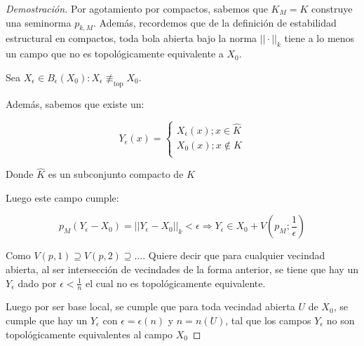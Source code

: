 \begin{proof}[Demostración]
	Por agotamiento por compactos, sabemos que $K_M = K$ construye una seminorma $p_{k,M}$. Además, recordemos que de la definición de estabilidad estructural en compactos, toda bola abierta bajo la norma $||\cdot||_{k}$ tiene a lo menos un campo que no es topológicamente equivalente a $X_0$. 
	
	Sea $X_\epsilon \in B_\epsilon(X_0): X_\epsilon \not \equiv_{\text{top}} X_0$. 
	
	Además, sabemos que existe un:
	
	\begin{equation*}
		Y_\epsilon(x) = \begin{cases}
			X_\epsilon(x) ; x \in \hat{K}\\
			X_0(x) ; x \notin K\\ 
		\end{cases}
	\end{equation*}
	
	Donde $\hat{K}$ es un subconjunto compacto de $K$
	
	Luego este campo cumple:
	
	\begin{equation*}
		p_{M}(Y_\epsilon - X_0) = ||Y_\epsilon  - X_0||_k < \epsilon \Rightarrow Y_\epsilon \in X_0 + V(p_M ; \frac{1}{\epsilon})  
	\end{equation*}
	
	Como $V(p, 1 ) \supseteq V(p,2) \supseteq \dots$. Quiere decir que para cualquier vecindad abierta, al ser intersección de vecindades de la forma anterior, se tiene que hay un $Y_\epsilon$ dado por $\epsilon < \frac{1}{n}$ el cual no es topológicamente equivalente.
	
	Luego por ser base local, se cumple que para toda vecindad abierta $U$ de $X_0$, se cumple que hay un $Y_\epsilon$ con $\epsilon = \epsilon(n) $ y $n = n (U)$, tal que los campos $Y_\epsilon$ no son topológicamente equivalentes al campo $X_0$
\end{proof}



